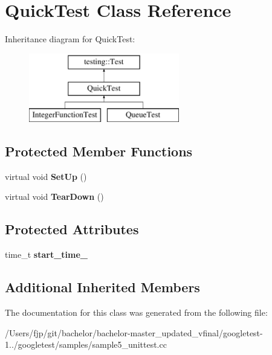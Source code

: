 \hypertarget{class_quick_test}{}\section{Quick\+Test Class Reference}
\label{class_quick_test}
Inheritance diagram for Quick\+Test\+:\begin{figure}[H]
\begin{center}
\leavevmode
\includegraphics[height=3.000000cm]{class_quick_test}
\end{center}
\end{figure}
\subsection*{Protected Member Functions}
\begin{DoxyCompactItemize}
\item 
\mbox{\label{class_quick_test_ae52ad082887512b92240ce40a1a05650}} 
virtual void {\bfseries Set\+Up} ()
\item 
\mbox{\label{class_quick_test_a6b2d16cc0c69d30a16fe612db5abfc39}} 
virtual void {\bfseries Tear\+Down} ()
\end{DoxyCompactItemize}
\subsection*{Protected Attributes}
\begin{DoxyCompactItemize}
\item 
\mbox{\label{class_quick_test_aba6a28bbd733e72e3b088a0b66386809}} 
time\+\_\+t {\bfseries start\+\_\+time\+\_\+}
\end{DoxyCompactItemize}
\subsection*{Additional Inherited Members}


The documentation for this class was generated from the following file\+:\begin{DoxyCompactItemize}
\item 
/\+Users/fjp/git/bachelor/bachelor-\/master\+\_\+updated\+\_\+vfinal/googletest-\/1../googletest/samples/sample5\+\_\+unittest.\+cc\end{DoxyCompactItemize}
